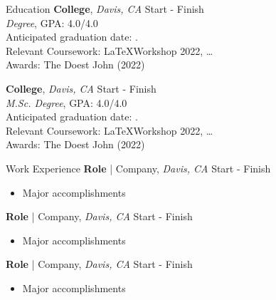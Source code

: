 \documentclass[10pt]{resume} %
\begin{document}
\vspace*{-2mm}
\begin{rSection}{Education}
	{\bf College}, \emph{Davis, CA} \hfill {Start - Finish}\\
	\emph{Degree}, GPA: 4.0/4.0\\ 
	Anticipated graduation date: .\\
	\hspace*{5mm} {\small Relevant Coursework: \LaTeX Workshop 2022, \ldots}\\ 
	\hspace*{5mm} {\small Awards: The Doest John (2022)}
	
	{\bf College}, \emph{Davis, CA} \hfill {Start - Finish}\\
	\emph{M.Sc. Degree}, GPA: 4.0/4.0\\ 
	Anticipated graduation date: .\\
	\hspace*{5mm} {\small Relevant Coursework: \LaTeX Workshop 2022, \ldots}\\ 
	\hspace*{5mm} {\small Awards: The Doest John (2022)}
	
\end{rSection}

\vspace*{-2mm}
\begin{rSection}{Work Experience}
	{\bf Role} | Company, \emph{Davis, CA} \hfill {Start - Finish}
	\begin{itemize}
		\item{Major accomplishments}
	\end{itemize}
	{\bf Role} | Company, \emph{Davis, CA} \hfill {Start - Finish}
	\begin{itemize}
		\item{Major accomplishments}
	\end{itemize}{\bf Role} | Company, \emph{Davis, CA} \hfill {Start - Finish}
\begin{itemize}
\item{Major accomplishments}
\end{itemize}	
\end{rSection}
\end{document}
